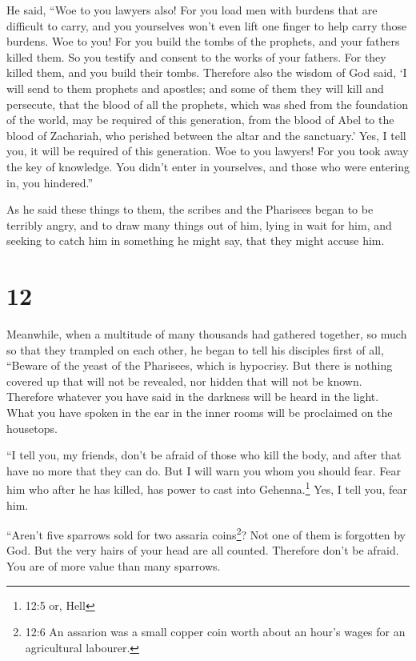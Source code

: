  He said, ``Woe to you lawyers also! For you load men with
burdens that are difficult to carry, and you yourselves won't even lift
one finger to help carry those burdens.  Woe to you! For
you build the tombs of the prophets, and your fathers killed them.
 So you testify and consent to the works of your fathers.
For they killed them, and you build their tombs.  Therefore
also the wisdom of God said, `I will send to them prophets and apostles;
and some of them they will kill and persecute,  that the
blood of all the prophets, which was shed from the foundation of the
world, may be required of this generation,  from the blood
of Abel to the blood of Zachariah, who perished between the altar and
the sanctuary.' Yes, I tell you, it will be required of this generation.
 Woe to you lawyers! For you took away the key of
knowledge. You didn't enter in yourselves, and those who were entering
in, you hindered.''

 As he said these things to them, the scribes and the
Pharisees began to be terribly angry, and to draw many things out of
him,  lying in wait for him, and seeking to catch him in
something he might say, that they might accuse him.

\hypertarget{section-11}{%
\section{12}\label{section-11}}

 Meanwhile, when a multitude of many thousands had gathered
together, so much so that they trampled on each other, he began to tell
his disciples first of all, ``Beware of the yeast of the Pharisees,
which is hypocrisy.  But there is nothing covered up that
will not be revealed, nor hidden that will not be known. 
Therefore whatever you have said in the darkness will be heard in the
light. What you have spoken in the ear in the inner rooms will be
proclaimed on the housetops.

 ``I tell you, my friends, don't be afraid of those who kill
the body, and after that have no more that they can do.  But
I will warn you whom you should fear. Fear him who after he has killed,
has power to cast into Gehenna.\footnote{12:5 or, Hell} Yes, I tell you,
fear him.

 ``Aren't five sparrows sold for two assaria
coins\footnote{12:6 An assarion was a small copper coin worth about an
  hour's wages for an agricultural labourer.}? Not one of them is
forgotten by God.  But the very hairs of your head are all
counted. Therefore don't be afraid. You are of more value than many
sparrows.

